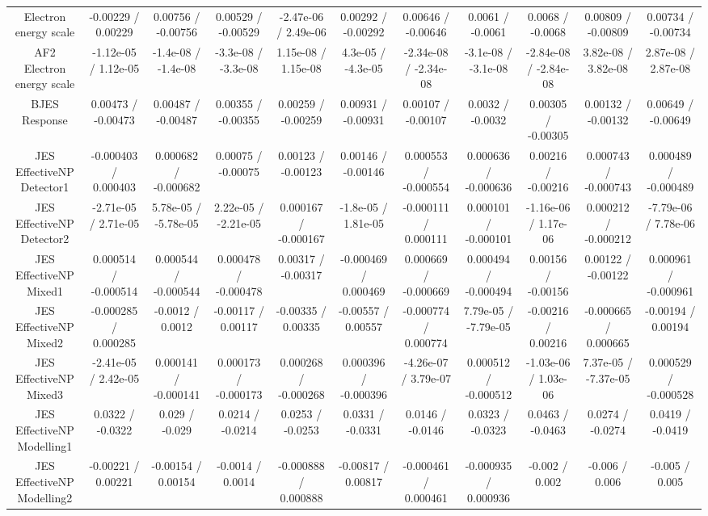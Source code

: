 \begin{table}[htbp]
\begin{center}
\begin{tabular}{|c|c|c|c|c|c|c|c|c|c|c|}
  Electron energy scale & -0.00229 / 0.00229 & 0.00756 / -0.00756 & 0.00529 / -0.00529 & -2.47e-06 / 2.49e-06 & 0.00292 / -0.00292 & 0.00646 / -0.00646 & 0.0061 / -0.0061 & 0.0068 / -0.0068 & 0.00809 / -0.00809 & 0.00734 / -0.00734 \\ 
  AF2 Electron energy scale & -1.12e-05 / 1.12e-05 & -1.4e-08 / -1.4e-08 & -3.3e-08 / -3.3e-08 & 1.15e-08 / 1.15e-08 & 4.3e-05 / -4.3e-05 & -2.34e-08 / -2.34e-08 & -3.1e-08 / -3.1e-08 & -2.84e-08 / -2.84e-08 & 3.82e-08 / 3.82e-08 & 2.87e-08 / 2.87e-08 \\ 
  BJES Response & 0.00473 / -0.00473 & 0.00487 / -0.00487 & 0.00355 / -0.00355 & 0.00259 / -0.00259 & 0.00931 / -0.00931 & 0.00107 / -0.00107 & 0.0032 / -0.0032 & 0.00305 / -0.00305 & 0.00132 / -0.00132 & 0.00649 / -0.00649 \\ 
  JES EffectiveNP Detector1 & -0.000403 / 0.000403 & 0.000682 / -0.000682 & 0.00075 / -0.00075 & 0.00123 / -0.00123 & 0.00146 / -0.00146 & 0.000553 / -0.000554 & 0.000636 / -0.000636 & 0.00216 / -0.00216 & 0.000743 / -0.000743 & 0.000489 / -0.000489 \\ 
  JES EffectiveNP Detector2 & -2.71e-05 / 2.71e-05 & 5.78e-05 / -5.78e-05 & 2.22e-05 / -2.21e-05 & 0.000167 / -0.000167 & -1.8e-05 / 1.81e-05 & -0.000111 / 0.000111 & 0.000101 / -0.000101 & -1.16e-06 / 1.17e-06 & 0.000212 / -0.000212 & -7.79e-06 / 7.78e-06 \\ 
  JES EffectiveNP Mixed1 & 0.000514 / -0.000514 & 0.000544 / -0.000544 & 0.000478 / -0.000478 & 0.00317 / -0.00317 & -0.000469 / 0.000469 & 0.000669 / -0.000669 & 0.000494 / -0.000494 & 0.00156 / -0.00156 & 0.00122 / -0.00122 & 0.000961 / -0.000961 \\ 
  JES EffectiveNP Mixed2 & -0.000285 / 0.000285 & -0.0012 / 0.0012 & -0.00117 / 0.00117 & -0.00335 / 0.00335 & -0.00557 / 0.00557 & -0.000774 / 0.000774 & 7.79e-05 / -7.79e-05 & -0.00216 / 0.00216 & -0.000665 / 0.000665 & -0.00194 / 0.00194 \\ 
  JES EffectiveNP Mixed3 & -2.41e-05 / 2.42e-05 & 0.000141 / -0.000141 & 0.000173 / -0.000173 & 0.000268 / -0.000268 & 0.000396 / -0.000396 & -4.26e-07 / 3.79e-07 & 0.000512 / -0.000512 & -1.03e-06 / 1.03e-06 & 7.37e-05 / -7.37e-05 & 0.000529 / -0.000528 \\ 
  JES EffectiveNP Modelling1 & 0.0322 / -0.0322 & 0.029 / -0.029 & 0.0214 / -0.0214 & 0.0253 / -0.0253 & 0.0331 / -0.0331 & 0.0146 / -0.0146 & 0.0323 / -0.0323 & 0.0463 / -0.0463 & 0.0274 / -0.0274 & 0.0419 / -0.0419 \\ 
  JES EffectiveNP Modelling2 & -0.00221 / 0.00221 & -0.00154 / 0.00154 & -0.0014 / 0.0014 & -0.000888 / 0.000888 & -0.00817 / 0.00817 & -0.000461 / 0.000461 & -0.000935 / 0.000936 & -0.002 / 0.002 & -0.006 / 0.006 & -0.005 / 0.005 \\ 

\end{tabular}
\end{center}
\end{table}
